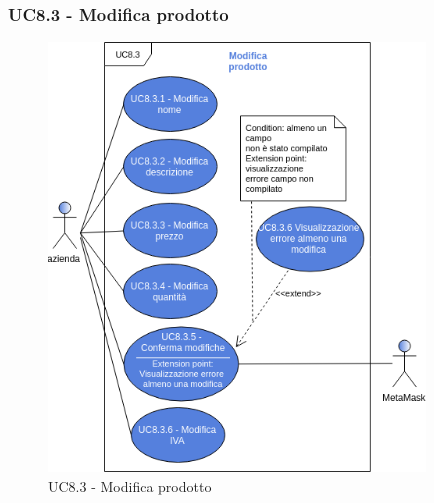 \subsubsection{UC8.3 - Modifica prodotto}
\begin{figure}[H]
	\includegraphics[width=10cm]{res/images/UC8-Modifica.png}
	\centering
	\caption{UC8.3 - Modifica prodotto}
\end{figure}

